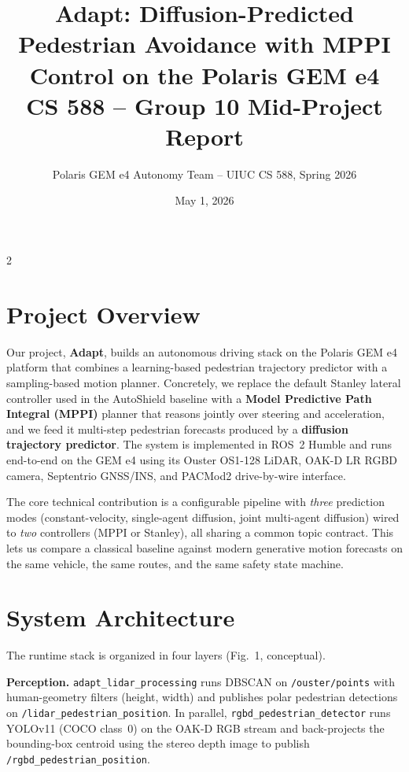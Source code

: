 \documentclass[10pt,letterpaper]{article}
\title{\vspace{-2em}\textbf{Adapt: Diffusion-Predicted Pedestrian Avoidance with MPPI Control on the Polaris GEM e4}\\[0.2em]\large CS 588 -- Group 10 Mid-Project Report}
\author{Polaris GEM e4 Autonomy Team -- UIUC CS 588, Spring 2026}
\date{\vspace{-1em}May 1, 2026}
\begin{document}
\maketitle
\vspace{-1.5em}

\begin{multicols}{2}

\section{Project Overview}

Our project, \textbf{Adapt}, builds an autonomous driving stack on the
Polaris GEM e4 platform that combines a learning-based pedestrian
trajectory predictor with a sampling-based motion planner.  Concretely,
we replace the default Stanley lateral controller used in the AutoShield
baseline with a \textbf{Model Predictive Path Integral (MPPI)} planner
that reasons jointly over steering and acceleration, and we feed it
multi-step pedestrian forecasts produced by a \textbf{diffusion
trajectory predictor}.  The system is implemented in ROS~2 Humble and
runs end-to-end on the GEM e4 using its Ouster OS1-128 LiDAR, OAK-D LR
RGBD camera, Septentrio GNSS/INS, and PACMod2 drive-by-wire interface.

The core technical contribution is a configurable pipeline with
\emph{three} prediction modes (constant-velocity, single-agent
diffusion, joint multi-agent diffusion) wired to \emph{two} controllers
(MPPI or Stanley), all sharing a common topic contract.  This lets us
compare a classical baseline against modern generative motion forecasts
on the same vehicle, the same routes, and the same safety state machine.

\section{System Architecture}

The runtime stack is organized in four layers (Fig.~1, conceptual).

\textbf{Perception.} \texttt{adapt\_lidar\_processing} runs DBSCAN on
\texttt{/ouster/points} with human-geometry filters (height, width) and
publishes polar pedestrian detections on
\texttt{/lidar\_pedestrian\_position}.  In parallel,
\texttt{rgbd\_pedestrian\_detector} runs YOLOv11 (COCO class~0) on the
OAK-D RGB stream and back-projects the bounding-box centroid using the
stereo depth image to publish
\texttt{/rgbd\_pedestrian\_position}.


\end{multicols}
\end{document}
